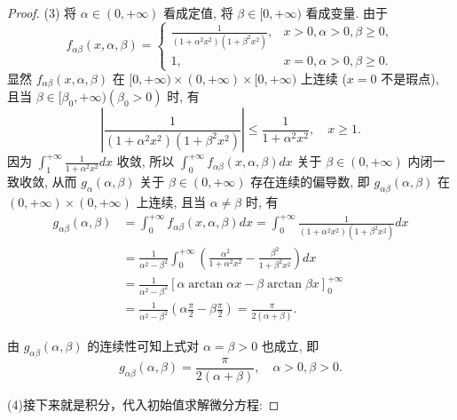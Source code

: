 \documentclass[lang=cn,newtx,10pt,scheme=chinese]{elegantbook}
\begin{document}
\begin{proof}
(3) 将 $\alpha \in (0, +\infty)$ 看成定值, 将 $\beta \in [0, +\infty)$ 看成变量. 由于
$$ f_{\alpha\beta}(x, \alpha, \beta) = \begin{cases} \frac{1}{(1+\alpha^2x^2)(1+\beta^2x^2)}, & x>0, \alpha>0, \beta \ge 0, \\ 1, & x=0, \alpha>0, \beta \ge 0. \end{cases} $$
显然 $f_{\alpha\beta}(x, \alpha, \beta)$ 在 $[0, +\infty) \times (0, +\infty) \times [0, +\infty)$ 上连续 ($x=0$ 不是瑕点), 且当 $\beta \in [\beta_0, +\infty) (\beta_0 > 0)$ 时, 有
$$ \left| \frac{1}{(1+\alpha^2x^2)(1+\beta^2x^2)} \right| \le \frac{1}{1+\alpha^2x^2}, \quad x \ge 1. $$
因为 $\int_1^{+\infty} \frac{1}{1+\alpha^2x^2} dx$ 收敛, 所以 $\int_0^{+\infty} f_{\alpha\beta}(x, \alpha, \beta) dx$ 关于 $\beta \in (0, +\infty)$ 内闭一致收敛, 从而 $g_\alpha(\alpha, \beta)$ 关于 $\beta \in (0, +\infty)$ 存在连续的偏导数, 即 $g_{\alpha\beta}(\alpha, \beta)$ 在 $(0, +\infty) \times (0, +\infty)$ 上连续, 且当 $\alpha \ne \beta$ 时, 有
\begin{align*}
g_{\alpha\beta}(\alpha, \beta) &= \int_0^{+\infty} f_{\alpha\beta}(x, \alpha, \beta) dx = \int_0^{+\infty} \frac{1}{(1+\alpha^2x^2)(1+\beta^2x^2)} dx \\
&= \frac{1}{\alpha^2 - \beta^2} \int_0^{+\infty} \left( \frac{\alpha^2}{1+\alpha^2x^2} - \frac{\beta^2}{1+\beta^2x^2} \right) dx \\
&= \frac{1}{\alpha^2 - \beta^2} \left[ \alpha \arctan \alpha x - \beta \arctan \beta x \right]_0^{+\infty} \\
&= \frac{1}{\alpha^2 - \beta^2} \left( \alpha \frac{\pi}{2} - \beta \frac{\pi}{2} \right) = \frac{\pi}{2(\alpha+\beta)}.
\end{align*}

由 $g_{\alpha\beta}(\alpha, \beta)$ 的连续性可知上式对 $\alpha = \beta > 0$ 也成立, 即
$$ g_{\alpha\beta}(\alpha, \beta) = \frac{\pi}{2(\alpha+\beta)}, \quad \alpha > 0, \beta > 0. $$

(4)接下来就是积分，代入初始值求解微分方程:


\end{proof}
\end{document}
